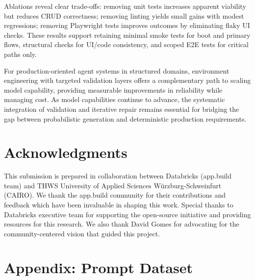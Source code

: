 \documentclass[conference]{IEEEtran}
\begin{document}
Ablations reveal clear trade-offs: removing unit tests increases apparent viability but reduces CRUD correctness; removing linting yields small gains with modest regressions; removing Playwright tests improves outcomes by eliminating flaky UI checks. These results support retaining minimal smoke tests for boot and primary flows, structural checks for UI/code consistency, and scoped E2E tests for critical paths only.

For production-oriented agent systems in structured domains, environment engineering with targeted validation layers offers a complementary path to scaling model capability, providing measurable improvements in reliability while managing cost. As model capabilities continue to advance, the systematic integration of validation and iterative repair remains essential for bridging the gap between probabilistic generation and deterministic production requirements.

\section*{Acknowledgments}

This submission is prepared in collaboration between Databricks (app.build team) and THWS University of Applied Sciences Würzburg-Schweinfurt (CAIRO). We thank the app.build community for their contributions and feedback which have been invaluable in shaping this work. Special thanks to Databricks executive team for supporting the open-source initiative and providing resources for this research. We also thank David Gomes for advocating for the community-centered vision that guided this project.





\section*{Appendix: Prompt Dataset}
\label{sec:prompt-dataset}
\end{document}
